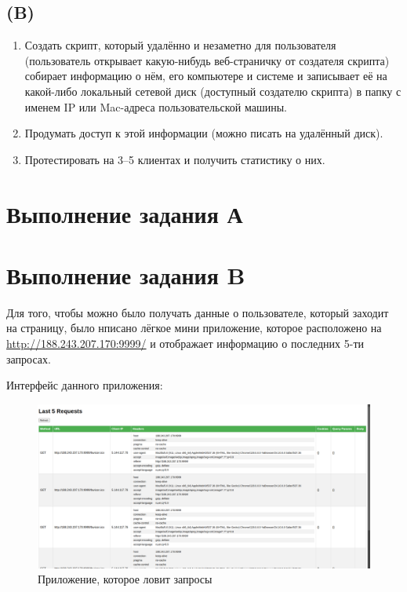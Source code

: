 \documentclass[a4paper, 12pt]{article}
\begin{document}
\subsection{(B)}

\begin{enumerate}
    \item Создать скрипт, который удалённо и незаметно для пользователя (пользователь открывает какую-нибудь веб-страничку от создателя скрипта) собирает информацию о нём, его компьютере и системе и записывает её на какой-либо локальный сетевой диск (доступный создателю скрипта) в папку с именем IP или Mac-адреса пользовательской машины.
    \item Продумать доступ к этой информации (можно писать на удалённый диск).
    \item Протестировать на 3–5 клиентах и получить статистику о них.
\end{enumerate}


\section{Выполнение задания А}



\section{Выполнение задания B}

Для того, чтобы можно было получать данные о пользователе, который заходит на страницу, было нписано лёгкое мини приложение, которое расположено на \href{http://188.243.207.170:9999/}{http://188.243.207.170:9999/} и отображает информацию о последних 5-ти запросах.

Интерфейс данного приложения: 

\begin{figure}[h!]
    \noindent
    \centering
    \includegraphics[width=1\linewidth]{pic_9999_ui_1.png}
    \caption{Приложение, которое ловит запросы}
\end{figure}
\end{document}
